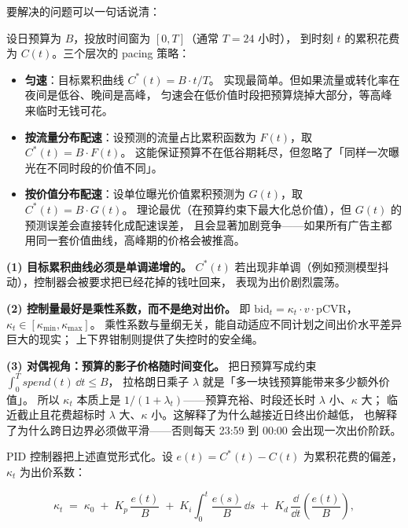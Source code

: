  要解决的问题可以一句话说清：

设日预算为 $B$，投放时间窗为 $[0, T]$（通常 $T = 24$ 小时），
到时刻 $t$ 的累积花费为 $C(t)$。三个层次的 pacing 策略：

\begin{itemize}
  \item \textbf{匀速}：目标累积曲线 $C^{*}(t) = B \cdot t / T$。
        实现最简单。但如果流量或转化率在夜间是低谷、晚间是高峰，
        匀速会在低价值时段把预算烧掉大部分，等高峰来临时无钱可花。
  \item \textbf{按流量分布配速}：设预测的流量占比累积函数为 $F(t)$，取 $C^{*}(t) = B \cdot F(t)$。
        这能保证预算不在低谷期耗尽，但忽略了「同样一次曝光在不同时段的价值不同」。
  \item \textbf{按价值分布配速}：设单位曝光价值累积预测为 $G(t)$，取 $C^{*}(t) = B \cdot G(t)$。
        理论最优（在预算约束下最大化总价值），但 $G(t)$ 的预测误差会直接转化成配速误差，
        且会显著加剧竞争——如果所有广告主都用同一套价值曲线，高峰期的价格会被推高。
\end{itemize}

\begin{formulacard}
\textbf{(1) 目标累积曲线必须是单调递增的。}
$C^{*}(t)$ 若出现非单调（例如预测模型抖动），控制器会被要求把已经花掉的钱吐回来，
表现为出价剧烈震荡。

\textbf{(2) 控制量最好是乘性系数，而不是绝对出价。}
即 $\mathrm{bid}_t = \kappa_t \cdot v \cdot \mathrm{pCVR}$，$\kappa_t \in [\kappa_{\min}, \kappa_{\max}]$。
乘性系数与量纲无关，能自动适应不同计划之间出价水平差异巨大的现实；
上下界钳制则提供了失控时的安全绳。

\textbf{(3) 对偶视角：预算的影子价格随时间变化。}
把日预算写成约束 $\int_0^T spend(t)\,\dd t \le B$，
拉格朗日乘子 $\lambda$ 就是「多一块钱预算能带来多少额外价值」。
所以 $\kappa_t$ 本质上是 $1/(1+\lambda_t)$——预算充裕、时段还长时 $\lambda$ 小、$\kappa$ 大；
临近截止且花费超标时 $\lambda$ 大、$\kappa$ 小。这解释了为什么越接近日终出价越低，
也解释了为什么跨日边界必须做平滑——否则每天 23:59 到 00:00 会出现一次出价阶跃。
\end{formulacard}

PID 控制器把上述直觉形式化。设 $e(t) = C^{*}(t) - C(t)$ 为累积花费的偏差，
$\kappa_t$ 为出价系数：

\begin{equation}
\kappa_t \;=\; \kappa_{0} \;+\; K_p\, \frac{e(t)}{B}
\;+\; K_i \int_0^{t} \frac{e(s)}{B}\,\dd s
\;+\; K_d\, \frac{\dd}{\dd t}\!\left(\frac{e(t)}{B}\right),
\label{eq:pid}
\end{equation}

